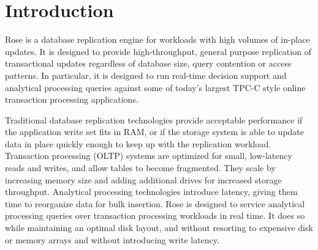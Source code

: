\documentclass{vldb}
\newcommand{\rows}{Rose\xspace}
\newcommand{\rowss}{Rose's\xspace}
\begin{document}
\begin{abstract}
\rowss throughput is limited by sequential I/O bandwidth.  We use
compression to reduce this bottleneck by adapting existing column
compression algorithms to a simple row-oriented data layout.  This
approach to database compression introduces negligible space overhead
and can be applied to most single-pass, randomly accessible
compression formats.  Our prototype uses lightweight (superscalar)
column compression algorithms.

Existing analytical models and our replication throughput
benchmarks reveal that, for applications with write sets larger than
RAM, \rows provides orders of magnitude greater throughput than
conventional replication techniques.

\end{abstract}





\section{Introduction}

\rows is a database replication engine for workloads with high volumes
of in-place updates.  It is designed to provide high-throughput,
general purpose replication of transactional updates regardless of
database size, query contention or access patterns.  In particular, it
is designed to run real-time decision support and analytical
processing queries against some of today's largest TPC-C style online
transaction processing applications.

Traditional database replication technologies provide acceptable
performance if the application write set fits in RAM, or if the
storage system is able to update data in place quickly enough to keep
up with the replication workload.  Transaction processing (OLTP)
systems are optimized for small, low-latency reads and writes, and allow tables to become fragmented.  They scale by
increasing memory size and adding additional drives for increased
storage throughput.  Analytical processing technologies introduce
latency, giving them time to reorganize data for bulk
insertion.  \rows is designed to service analytical processing queries
over transaction processing workloads in real time.  It does so
while maintaining an optimal disk layout, and without resorting to
expensive disk or memory arrays and without introducing write latency.
\end{document}
